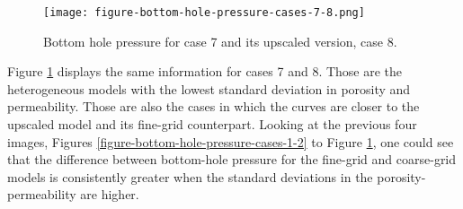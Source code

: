 %
\begin{figure}[H]
	\centering
	\texttt{[image: figure-bottom-hole-pressure-cases-7-8.png]}
	\caption{Bottom hole pressure for case 7 and its upscaled version, case 8.}
	\label{figure-bottom-hole-pressure-cases-7-8}
\end{figure}
\noindent
%
Figure \ref{figure-bottom-hole-pressure-cases-7-8} displays the same information for cases 7 and 8.
%
Those are the heterogeneous models with the lowest standard deviation in porosity and permeability.
%
Those are also the cases in which the curves are closer to the upscaled model and its fine-grid counterpart.
%
Looking at the previous four images, Figures \ref{figure-bottom-hole-pressure-cases-1-2} to Figure \ref{figure-bottom-hole-pressure-cases-7-8}, one could see that the difference between bottom-hole pressure for the fine-grid and coarse-grid models is consistently greater when the standard deviations in the porosity-permeability are higher.


